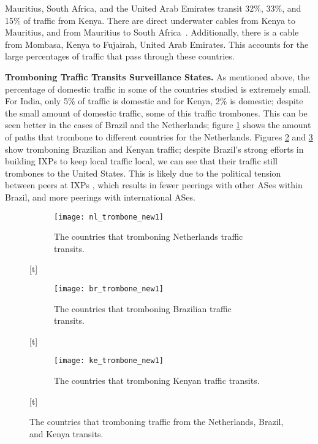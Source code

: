Mauritius, South Africa, and the United Arab Emirates transit 32\%, 33\%, and 15\% of traffic from Kenya.  There are direct underwater cables from Kenya to Mauritius, and from Mauritius to South Africa~\cite{cablemap}.  Additionally, there is a cable from Mombasa, Kenya to Fujairah, United Arab Emirates.  This accounts for the large percentages of traffic that pass through these countries.

{\bf Tromboning Traffic Transits Surveillance States.}
As mentioned above, the percentage of domestic traffic in some of the countries studied is extremely small.  For India, only 5\% of traffic is domestic and for Kenya, 2\% is domestic; despite the small amount of domestic traffic, some of this traffic trombones.  This can be seen better in the cases of Brazil and the Netherlands; figure \ref{fig:trombone_netherlands} shows the amount of paths that trombone to different countries for the Netherlands.  Figures \ref{fig:trombone_brazil} and \ref{fig:trombone_kenya} show tromboning Brazilian and Kenyan traffic; despite Brazil's strong efforts in building IXPs to keep local traffic local, we can see that their traffic still trombones to the United States.  This is likely due to the political tension between peers at IXPs , which results in fewer peerings with other ASes within Brazil, and more peerings with international ASes. 


\begin{figure*}[t!]
\begin{minipage}{\linewidth}
\begin{subfigure}[b]{.32\linewidth}
\texttt{[image: nl\_trombone\_new1]}
\caption{The countries that tromboning Netherlands traffic transits.\label{fig:trombone_netherlands}}
\end{subfigure}[t]\qquad
\begin{subfigure}[b]{.32\linewidth}
\texttt{[image: br\_trombone\_new1]}
\caption{The countries that tromboning Brazilian traffic transits.\label{fig:trombone_brazil}}
\end{subfigure}[t]\qquad
\begin{subfigure}[b]{.32\linewidth}
\texttt{[image: ke\_trombone\_new1]}
\caption{The countries that tromboning Kenyan traffic transits.\label{fig:trombone_kenya}}
\end{subfigure}[t]
\end{minipage}
\caption{The countries that tromboning traffic from the Netherlands, Brazil, and Kenya transits.}
\label{fig:trombone}
\end{figure*}

